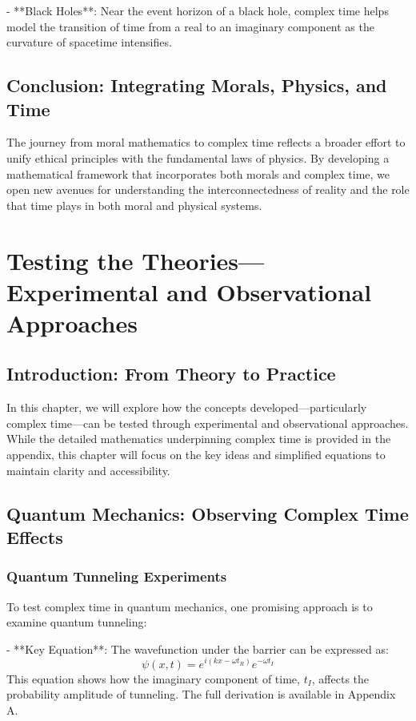 \documentclass{article}
\begin{document}
- **Black Holes**: Near the event horizon of a black hole, complex time helps model the transition of time from a real to an imaginary component as the curvature of spacetime intensifies.

\subsection{Conclusion: Integrating Morals, Physics, and Time}

The journey from moral mathematics to complex time reflects a broader effort to unify ethical principles with the fundamental laws of physics. By developing a mathematical framework that incorporates both morals and complex time, we open new avenues for understanding the interconnectedness of reality and the role that time plays in both moral and physical systems.



\section{Testing the Theories—Experimental and Observational Approaches}

\subsection{Introduction: From Theory to Practice}

In this chapter, we will explore how the concepts developed—particularly complex time—can be tested through experimental and observational approaches. While the detailed mathematics underpinning complex time is provided in the appendix, this chapter will focus on the key ideas and simplified equations to maintain clarity and accessibility.

\subsection{Quantum Mechanics: Observing Complex Time Effects}

\subsubsection{Quantum Tunneling Experiments}

To test complex time in quantum mechanics, one promising approach is to examine quantum tunneling:

- **Key Equation**: The wavefunction under the barrier can be expressed as:
\[
\psi(x, t) = e^{i \left( kx - \omega t_R \right)} e^{- \omega t_I}
\]
This equation shows how the imaginary component of time, \( t_I \), affects the probability amplitude of tunneling. The full derivation is available in Appendix A.
\end{document}
